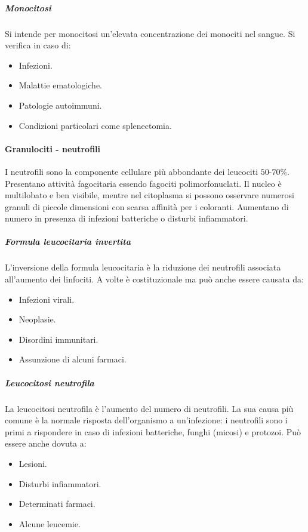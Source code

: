 				\subparagraph{Monocitosi}
				Si intende per monocitosi un'elevata concentrazione dei monociti nel sangue. 
				Si verifica in caso di:
		\begin{multicols}{2}
				\begin{itemize}
					\item Infezioni.
					\item Malattie ematologiche.
					\item Patologie autoimmuni.
					\item Condizioni particolari come splenectomia.
				\end{itemize}
			\end{multicols}

			\paragraph{Granulociti - neutrofili}
			I neutrofili sono la componente cellulare pi\`u abbondante dei leucociti $50$-$70\%$. 
			Presentano attivit\`a fagocitaria essendo fagociti polimorfonuclati.
			Il nucleo \`e multilobato e ben visibile, mentre nel citoplasma si possono osservare numerosi granuli di piccole dimensioni con scarsa affinit\`a per i coloranti.
			Aumentano di numero in presenza di infezioni batteriche o disturbi infiammatori. 

				\subparagraph{Formula leucocitaria invertita}
				L'inversione della formula leucocitaria \`e la riduzione dei neutrofili associata all'aumento dei linfociti.
				A volte \`e costituzionale ma pu\`o anche essere causata da:
		\begin{multicols}{2}
				\begin{itemize}
					\item Infezioni virali.
					\item Neoplasie.
					\item Disordini immunitari.
					\item Assunzione di alcuni farmaci.
				\end{itemize}
			\end{multicols}

				\subparagraph{Leucocitosi neutrofila}
				La leucocitosi neutrofila \`e l'aumento del numero di neutrofili.
				La sua causa pi\`u comune \`e la normale risposta dell'organismo a un'infezione: i neutrofili sono i primi a rispondere in caso di infezioni batteriche, funghi (micosi) e protozoi.
				Pu\`o essere anche dovuta a:
		\begin{multicols}{2}
				\begin{itemize}
					\item Lesioni.
					\item Disturbi infiammatori.
					\item Determinati farmaci.
					\item Alcune leucemie.
				\end{itemize}
			\end{multicols}

